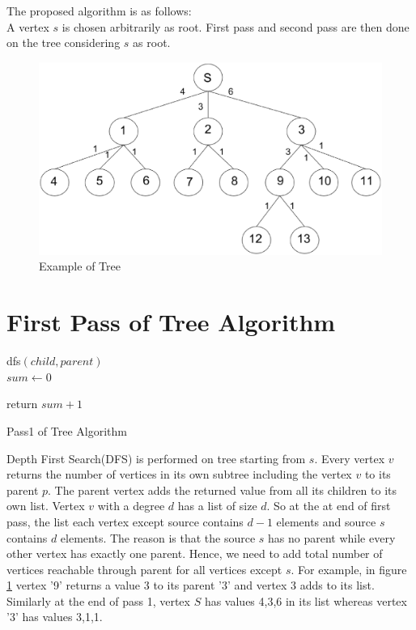 \hspace{-1.5em}The proposed algorithm is as follows:
\\
A vertex $s$ is chosen arbitrarily as root. First pass and second pass are then done on the tree considering $s$ as root.

\begin{figure}[htp]
\centering
\includegraphics[width=13cm]{images/exampletree.eps}
\caption{Example of Tree}
\label{fig:extree}
\end{figure}

\section{First Pass of Tree Algorithm}
\begin{algorithm}
dfs$(child, parent)$ \\
$sum \leftarrow 0$\;

return $sum + 1$\;
\caption{Pass1 of Tree Algorithm}

\end{algorithm}
Depth First Search(DFS) is performed on tree starting from $s$. Every vertex $v$ returns the number of vertices in its own subtree including the vertex $v$ to its parent $p$. The parent vertex adds the returned value from all its children to its own list.
Vertex $v$ with a degree $d$ has a list of size $d$.
So at the at end of first pass, the list each vertex except source contains $d-1$ elements and source $s$ contains $d$ elements. The reason is that the source $s$ has no parent while every other vertex has exactly one parent. Hence, we need to add total number of vertices reachable through parent for all vertices except $s$.
For example, in figure \ref{fig:extree} vertex '9' returns a value 3 to its parent '3' and vertex 3 adds to its list. Similarly at the end of pass 1, vertex $S$ has values 4,3,6 in its list whereas vertex '3' has values 3,1,1. 
\vspace{-1.0em}
